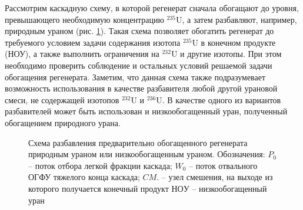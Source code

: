 Рассмотрим каскадную схему, в которой регенерат сначала обогащают до уровня, превышающего необходимую концентрацию $^{235}$U, а затем разбавляют, например, природным ураном (рис. \ref{o1}). Такая схема позволяет обогатить регенерат до требуемого условием задачи содержания изотопа $^{235}$U в конечном продукте (НОУ), а также выполнить ограничения на $^{232}$U и другие изотопы. При этом необходимо проверить соблюдение и остальных условий решаемой задачи обогащения регенерата. Заметим, что данная схема также подразумевает возможность использования в качестве разбавителя любой другой урановой смеси, не содержащей изотопов $^{232}$U и $^{236}$U. В качестве одного из вариантов разбавителей может быть использован и низкообогащенный уран, полученный обогащением природного урана.

\begin{figure}[ht]
  \caption{Схема разбавления предварительно обогащенного регенерата природным ураном или низкообогащенным ураном. Обозначения: $P_0$ -- поток отбора легкой фракции каскада; $W_0$ -- поток отвального ОГФУ тяжелого конца каскада; $CM.$ -- узел смешения, на выходе из которого получается конечный продукт $НОУ$ -- низкообогащенный уран}\label{o1}
\end{figure}


